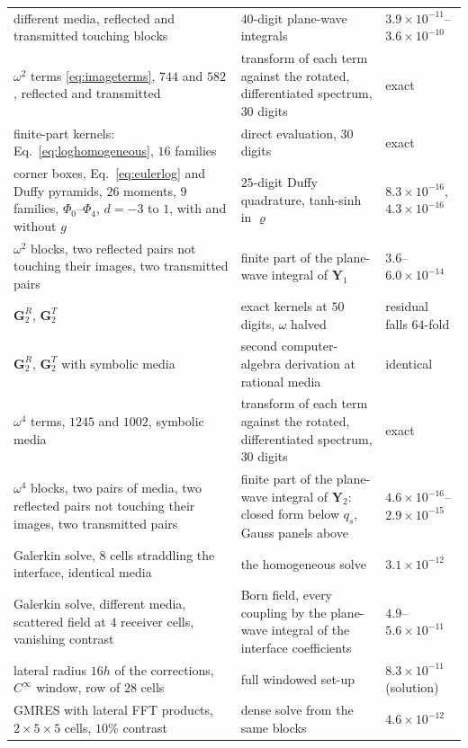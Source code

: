 \documentclass[11pt,a4paper]{article}
\begin{document}
\begin{longtable}{>{\raggedright\arraybackslash}p{}>{\raggedright\arraybackslash}p{}>{\raggedright\arraybackslash}p{}}
different media, reflected and transmitted touching blocks & $40$-digit plane-wave integrals & $3.9\times10^{-11}$--$3.6\times10^{-10}$ \\
$\omega^2$ terms \eqref{eq:imageterms}, $744$ and $582$, reflected and transmitted & transform of each term against the rotated, differentiated spectrum, $30$ digits & exact \\
finite-part kernels: Eq.~\eqref{eq:loghomogeneous}, $16$ families & direct evaluation, $30$ digits & exact \\
corner boxes, Eq.~\eqref{eq:eulerlog} and Duffy pyramids, $26$ moments, $9$ families, $\Phi_0$--$\Phi_4$, $d=-3$ to $1$, with and without $g$ & $25$-digit Duffy quadrature, tanh-sinh in $\varrho$ & $8.3\times10^{-16}$, $4.3\times10^{-16}$ \\
$\omega^2$ blocks, two reflected pairs not touching their images, two transmitted pairs & finite part of the plane-wave integral of $\mathbf Y_1$ & $3.6$--$6.0\times10^{-14}$ \\
$\mathbf G^{R}_2$, $\mathbf G^{T}_2$ & exact kernels at $50$ digits, $\omega$ halved & residual falls $64$-fold \\
$\mathbf G^{R}_2$, $\mathbf G^{T}_2$ with symbolic media & second computer-algebra derivation at rational media & identical \\
$\omega^4$ terms, $1245$ and $1002$, symbolic media & transform of each term against the rotated, differentiated spectrum, $30$ digits & exact \\
$\omega^4$ blocks, two pairs of media, two reflected pairs not touching their images, two transmitted pairs & finite part of the plane-wave integral of $\mathbf Y_2$: closed form below $q_s$, Gauss panels above & $4.6\times10^{-16}$--$2.9\times10^{-15}$ \\
Galerkin solve, $8$ cells straddling the interface, identical media & the homogeneous solve & $3.1\times10^{-12}$ \\
Galerkin solve, different media, scattered field at $4$ receiver cells, vanishing contrast & Born field, every coupling by the plane-wave integral of the interface coefficients & $4.9$--$5.6\times10^{-11}$ \\
lateral radius $16h$ of the corrections, $C^\infty$ window, row of $28$ cells & full windowed set-up & $8.3\times10^{-11}$ (solution) \\
GMRES with lateral FFT products, $2\times5\times5$ cells, $10\%$ contrast & dense solve from the same blocks & $4.6\times10^{-12}$ \\

\end{longtable}
\end{document}
